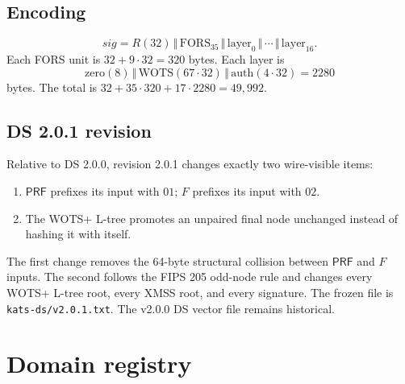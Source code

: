 \documentclass[11pt,a4paper]{article}
\theoremstyle{plain}
\theoremstyle{definition}
\theoremstyle{remark}
\newcommand{\concat}{\,\Vert\,}
\newcommand{\PRF}{\mathsf{PRF}}
\begin{document}
\subsection{Encoding}

\[
 \mathit{sig}=R(32)\concat
 \mathrm{FORS}_{35}\concat\mathrm{layer}_0\concat\cdots
 \concat\mathrm{layer}_{16}.
\]
Each FORS unit is $32+9\cdot32=320$ bytes.  Each layer is
\[
 \mathrm{zero}(8)\concat\mathrm{WOTS}(67\cdot32)
 \concat\mathrm{auth}(4\cdot32)=2280
\]
bytes.  The total is $32+35\cdot320+17\cdot2280=49{,}992$.

\subsection{DS 2.0.1 revision}

Relative to DS 2.0.0, revision 2.0.1 changes exactly two wire-visible
items:

\begin{enumerate}[leftmargin=*]
\item $\PRF$ prefixes its input with $01$; $F$ prefixes its input with
  $02$.
\item The WOTS+ L-tree promotes an unpaired final node unchanged
  instead of hashing it with itself.
\end{enumerate}

The first change removes the 64-byte structural collision between
$\PRF$ and $F$ inputs.  The second follows the FIPS 205 odd-node rule
and changes every WOTS+ L-tree root, every XMSS root, and every
signature.  The frozen file is \texttt{kats-ds/v2.0.1.txt}.  The
v2.0.0 DS vector file remains historical.

\section{Domain registry}
\label{sec:domains}
\end{document}
